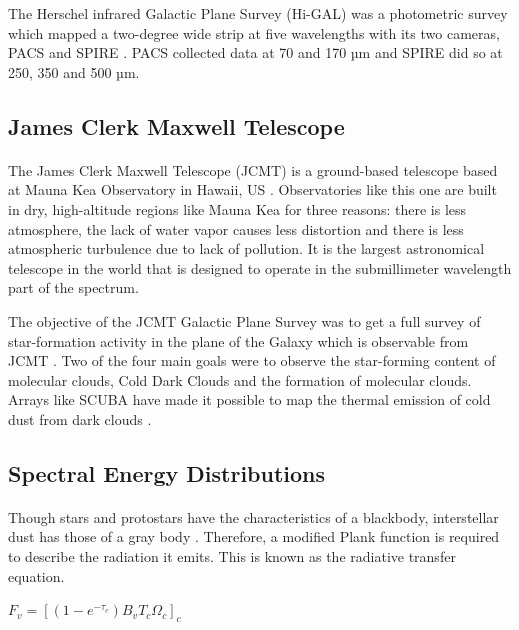 \documentclass{article}
\begin{document}
The Herschel infrared Galactic Plane Survey (Hi-GAL) was a photometric survey which mapped a two-degree wide strip at five wavelengths with its two cameras, PACS and SPIRE \cite{Molinari2010}. PACS collected data at 70 and 170 µm and SPIRE did so at 250, 350 and 500 µm. 

\subsection{James Clerk Maxwell Telescope}
\paragraph{}

The James Clerk Maxwell Telescope (JCMT) is a ground-based telescope based at Mauna Kea Observatory in Hawaii, US \cite{EAOa}. Observatories like this one are built in dry, high-altitude regions like Mauna Kea for three reasons: there is less atmosphere, the lack of water vapor causes less distortion and there is less atmospheric turbulence due to lack of pollution. It is the largest astronomical telescope in the world that is designed to operate in the submillimeter wavelength part of the spectrum. 

The objective of the JCMT Galactic Plane Survey was to get a full survey of star-formation activity in the plane of the Galaxy which is observable from JCMT \cite{EAOb}. Two of the four main goals were to observe the star-forming content of molecular clouds, Cold Dark Clouds and the formation of molecular clouds. Arrays like SCUBA have made it possible to map the thermal emission of cold dust from dark clouds \cite{Bergin2007}.

\subsection{Spectral Energy Distributions}
\paragraph{}

Though stars and protostars have the characteristics of a blackbody, interstellar dust has those of a gray body \cite{Dalloglio1995}. Therefore, a modified Plank function is required to describe the radiation it emits. This is known as the radiative transfer equation.

\begin{center}
$F_v={[(1-e^{-\tau_c } ) B_v T_c \Omega_c ]_c}$
\end{center}
\end{document}
